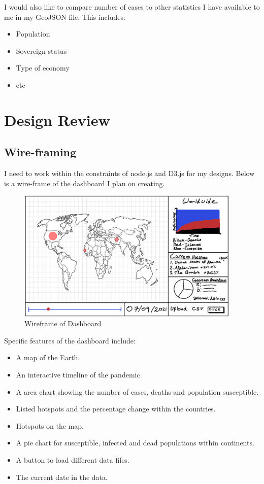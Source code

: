 \documentclass{report}
\begin{document}
I would also like to compare number of cases to other statistics I have available to me in my GeoJSON file. This includes:
\begin{itemize}
    \item Population
    \item Sovereign status
    \item Type of economy
    \item etc
\end{itemize}

\newpage
\chapter{Design Review}
\section{Wire-framing}
I need to work within the constraints of node.js and D3.js for my designs. Below is a wire-frame of the dashboard I plan on creating.
\begin{center}
    \begin{figure}[h]
        \centering
        \includegraphics[width=0.95\textwidth]{Images/Home_Wireframe.png}
        \caption{Wireframe of Dashboard}
        \label{fig:wireframe_world}
    \end{figure}
\end{center}
Specific features of the dashboard include:
\begin{itemize}
    \item A map of the Earth.
    \item An interactive timeline of the pandemic.
    \item A area chart showing the number of cases, deaths and population susceptible.
    \item Listed hotspots and the percentage change within the countries.
    \item Hotspots on the map.
    \item A pie chart for susceptible, infected and dead populations within continents.
    \item A button to load different data files.
    \item The current date in the data.
\end{itemize}
\end{document}
